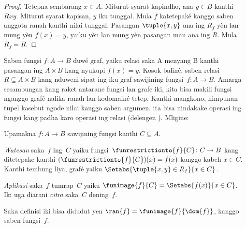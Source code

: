 \documentclass[../../../include/open-logic-section]{subfiles}
\begin{document}
\begin{proof}
Tetepna sembarang $x \in A$. Miturut syarat kapindho, ana $y \in B$ kanthi
$Rxy$. Miturut syarat kapisan, $y$ iku tunggal. Mula $f$ katetepaké
kanggo saben anggota ranah kanthi nilai tunggal. Pasangan
$\tuple{x,y}$ ana ing $R_f$ yèn lan mung yèn $f(x)=y$, yaiku yèn lan
mung yèn pasangan mau ana ing $R$. Mula $R_f=R$.
\end{proof}

\begin{explain}
Saben fungsi $f\colon A \to B$ duwé graf, yaiku relasi saka A menyang B kanthi pasangan ing $A
\times B$ kang nyukupi $f(x) = y$. Kosok baliné, saben relasi~$R
\subseteq A \times B$ kang nduweni sipat ing
 iku graf sawijining fungsi~$f \colon A \to
B$. Amarga sesambungan kang raket antarane fungsi lan grafe iki,
kita bisa makili fungsi nganggo grafé nalika ranah lan kodomainé tetep.
Kanthi mangkono, himpunan tupel kasebut ngode nilai kanggo saben argumen. ita bisa nindakake operasi ing
fungsi kang padha karo operasi ing relasi (delengen
). Mligine:
\end{explain}

\begin{defn}
Upamakna $f \colon A \to B$ sawijining fungsi kanthi $C\subseteq A$.

\emph{Watesan} saka~$f$ ing~$C$ yaiku
fungsi~$\funrestrictionto{f}{C}\colon C \to B$ kang ditetepake kanthi
$(\funrestrictionto{f}{C})(x) = f(x)$ kanggo kabeh $x \in C$. Kanthi tembung
liya, grafé yaiku $\Setabs{\tuple{x, y} \in R_f}{x \in
C}$.

\emph{Aplikasi} saka~$f$ tumrap~$C$ yaiku $\funimage{f}{C} =
\Setabs{f(x)}{x \in C}$. Iki uga diarani \emph{citra} saka~$C$
dening~$f$.
\end{defn}

\begin{explain}
Saka definisi iki bisa didudut yen $\ran{f} =
\funimage{f}{\dom{f}}$, kanggo saben fungsi~$f$.
\end{explain}
\end{document}
